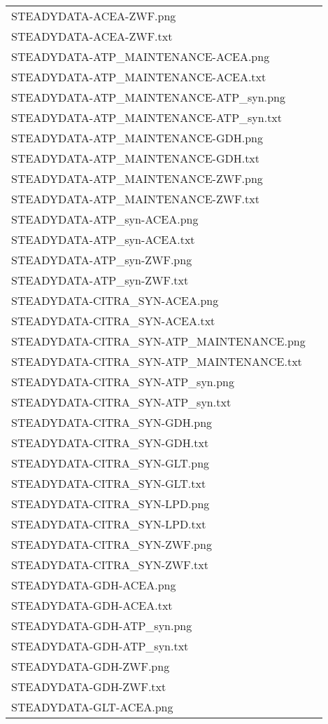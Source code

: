\documentclass[a4paper, parskip=full]{scrreprt}
\begin{document}
\begin{longtable}{ll}
STEADYDATA-ACEA-ZWF.png\\
STEADYDATA-ACEA-ZWF.txt\\
STEADYDATA-ATP\_MAINTENANCE-ACEA.png\\
STEADYDATA-ATP\_MAINTENANCE-ACEA.txt\\
STEADYDATA-ATP\_MAINTENANCE-ATP\_syn.png\\
STEADYDATA-ATP\_MAINTENANCE-ATP\_syn.txt\\
STEADYDATA-ATP\_MAINTENANCE-GDH.png\\
STEADYDATA-ATP\_MAINTENANCE-GDH.txt\\
STEADYDATA-ATP\_MAINTENANCE-ZWF.png\\
STEADYDATA-ATP\_MAINTENANCE-ZWF.txt\\
STEADYDATA-ATP\_syn-ACEA.png\\
STEADYDATA-ATP\_syn-ACEA.txt\\
STEADYDATA-ATP\_syn-ZWF.png\\
STEADYDATA-ATP\_syn-ZWF.txt\\
STEADYDATA-CITRA\_SYN-ACEA.png\\
STEADYDATA-CITRA\_SYN-ACEA.txt\\
STEADYDATA-CITRA\_SYN-ATP\_MAINTENANCE.png\\
STEADYDATA-CITRA\_SYN-ATP\_MAINTENANCE.txt\\
STEADYDATA-CITRA\_SYN-ATP\_syn.png\\
STEADYDATA-CITRA\_SYN-ATP\_syn.txt\\
STEADYDATA-CITRA\_SYN-GDH.png\\
STEADYDATA-CITRA\_SYN-GDH.txt\\
STEADYDATA-CITRA\_SYN-GLT.png\\
STEADYDATA-CITRA\_SYN-GLT.txt\\
STEADYDATA-CITRA\_SYN-LPD.png\\
STEADYDATA-CITRA\_SYN-LPD.txt\\
STEADYDATA-CITRA\_SYN-ZWF.png\\
STEADYDATA-CITRA\_SYN-ZWF.txt\\
STEADYDATA-GDH-ACEA.png\\
STEADYDATA-GDH-ACEA.txt\\
STEADYDATA-GDH-ATP\_syn.png\\
STEADYDATA-GDH-ATP\_syn.txt\\
STEADYDATA-GDH-ZWF.png\\
STEADYDATA-GDH-ZWF.txt\\
STEADYDATA-GLT-ACEA.png\\

\end{longtable}
\end{document}
